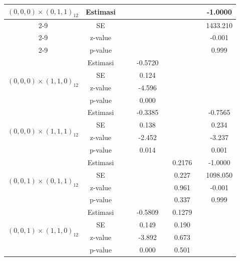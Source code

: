 \begin{enumerate}[label=\alph*.]
\begin{longtable}{|c|c|c|c|c|c|c|c|c|}
            \multirow{4}{*}{$(0,0,0)\times(0,1,1)_{12}$}
            & Estimasi & {} & {} & {} & {} & {} & {} & -1.0000 \\ \cline{2-9}
            & SE       & {} & {} & {} & {} & {} & {} & 1433.210\\ \cline{2-9}
            & z-value  &  {}   & {} & {} & {} & {} & {} & -0.001 \\ \cline{2-9}
            & p-value  & {} & {} & {} & {} & {} & {} & 0.999 \\ \hline

            \multirow{4}{*}{$(0,0,0)\times(1,1,0)_{12}$}
            & Estimasi & {} & {} & -0.5720 & {} & {} & {} & {} \\ \cline{2-9}
            & SE       & {} & {} & 0.124 & {} & {} & {} & {}\\ \cline{2-9}
            & z-value  & {} & {} & -4.596 & {} & {} & {} & {}\\ \cline{2-9}
            & p-value  & {} & {} & 0.000 & {} & {} & {} & {}\\ \hline

            \multirow{4}{*}{$(0,0,0)\times(1,1,1)_{12}$}
            & Estimasi & {} & {} & -0.3385 & {} & {} & {} & -0.7565\\ \cline{2-9}
            & SE       & {} & {} & 0.138 & {} & {} & {} & 0.234\\ \cline{2-9}
            & z-value  & {} & {} & -2.452 & {}   & {}   & {} & -3.237\\ \cline{2-9}
            & p-value  & {} & {} & 0.014 & {} & {} & {} & 0.001\\ \hline

            \multirow{4}{*}{$(0,0,1)\times(0,1,1)_{12}$}
            & Estimasi & {} & {} & {} & {} & 0.2176 & {} & -1.0000 \\ \cline{2-9}
            & SE       & {} & {} & {} & {} & 0.227 & {} & 1098.050\\ \cline{2-9}
            & z-value  & {} & {} & {} & {} & 0.961 & {} & -0.001\\ \cline{2-9}
            & p-value  & {} & {} & {} & {} & 0.337 & {} & 0.999\\ \hline

            \multirow{4}{*}{$(0,0,1)\times(1,1,0)_{12}$}
            & Estimasi & {} & {} & -0.5809 & {}  & 0.1279 & {} & {}\\ \cline{2-9}
            & SE       & {} & {} & 0.149 & {} & 0.190 & {} & {}\\ \cline{2-9}
            & z-value  & {} & {} & -3.892 & {} & 0.673 & {} & {}\\ \cline{2-9}
            & p-value  & {} & {} & 0.000 & {} & 0.501 & {} & {} \\ \hline


\end{longtable}
\end{enumerate}
